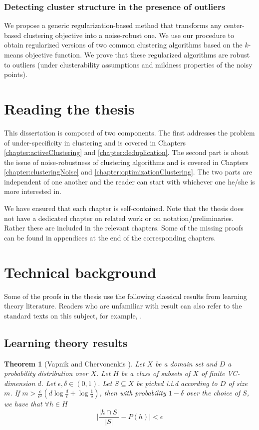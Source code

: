 \documentclass[12pt]{article}
\newtheorem{theorem}{Theorem}
\begin{document}
\subsubsection*{Detecting cluster structure in the presence of outliers}
We propose a generic regularization-based method that transforms any center-based clustering objective into a noise-robust one. We use our procedure to obtain regularized versions of two common clustering algorithms based on the $k$-means objective function. We prove that these regularized algorithms are robust to outliers (under clusterability assumptions and mildness properties of the noisy points).

\section{Reading the thesis}
This dissertation is composed of two components. The first addresses the problem of under-specificity in clustering and is covered in Chapters \ref{chapter:activeClustering} and \ref{chapter:deduplication}. The second part is about the issue of noise-robustness of clustering algorithms and is covered in Chapters \ref{chapter:clusteringNoise} and \ref{chapter:optimizationClustering}. The two parts are independent of one another and the reader can start with whichever one he/she is more interested in. 

We have ensured that each chapter is self-contained. Note that the thesis does not have a dedicated chapter on related work or on notation/preliminaries. Rather these are included in the relevant chapters. Some of the missing proofs can be found in appendices at the end of the corresponding chapters.

\section{Technical background}
Some of the proofs in the thesis use the following classical results from learning theory literature. Readers who are unfamiliar with result can also refer to the standard texts on this subject, for example, \cite{shalev2014understanding}.
 

\subsection{Learning theory results}
\begin{theorem}[Vapnik and Chervonenkis \cite{vapnik2015uniform}]
\label{thm:vceapprox}
Let $X$ be a domain set and $D$ a probability distribution over $X$. Let $H$ be a class of subsets of $X$ of finite VC-dimension $d$. Let $\epsilon, \delta \in (0,1)$. Let $S \subseteq X$ be picked i.i.d according to $D$ of size $m$. If $m > \frac{c}{\epsilon^2}(d\log \frac{d}{\epsilon}+\log\frac{1}{\delta})$, then  with probability $1-\delta$ over the choice of $S$, we have that $\forall h \in H$
$$\bigg|\frac{|h\cap S|}{|S|} - P(h)\bigg| < \epsilon$$
\end{theorem}
\end{document}

